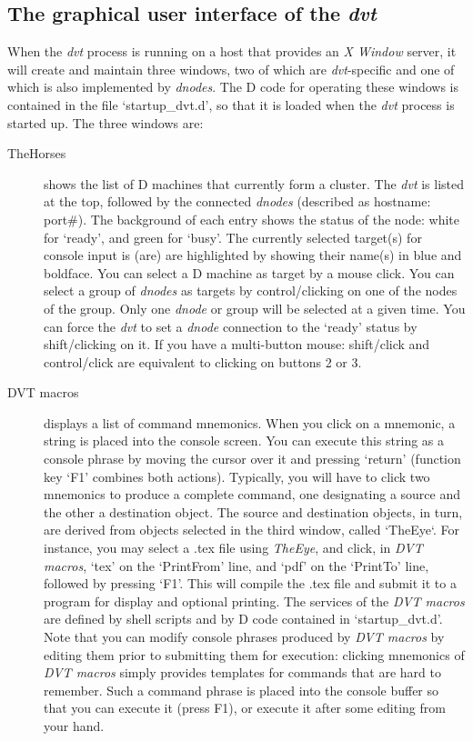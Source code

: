 \subsection{The graphical user interface of the  \emph{dvt}}

When the \emph{dvt} process is running on a host that provides an \emph{X Window} server, it will create and maintain three windows, two of which are \emph{dvt}-specific and one of which is also implemented by \emph{dnodes}. The D code for operating these windows is contained in the file `startup\_dvt.d', so that it is loaded when the \emph{dvt} process is started up. The three windows are:

\begin{description}
\item[TheHorses] shows the list of D machines that currently form a cluster. The \emph{dvt} is listed at the top, followed by the connected \emph{dnodes} (described as hostname: port\#). The background of each entry shows the status of the node: white for `ready', and green for `busy'. The currently selected target(s) for console input is (are) are highlighted by showing their name(s) in blue and boldface. You can select a D machine as target by a mouse click. You can select a group of \emph{dnodes} as targets by control/clicking on one of the nodes of the group. Only one \emph{dnode} or group will be selected at a given time. You can force the \emph{dvt} to set a \emph{dnode} connection to the `ready' status by shift/clicking on it. If you have a multi-button mouse: shift/click and control/click are equivalent to clicking on buttons 2 or 3.

\item[DVT macros] displays a list of command mnemonics. When you click on a mnemonic, a string is placed into the console screen. You can execute this string as a console phrase by moving the cursor over it and pressing `return' (function key `F1' combines both actions). Typically, you will have to click two mnemonics to produce a complete command, one designating a source and the other a destination object. The source and destination objects, in turn, are derived from objects selected in the third window, called `TheEye`. For instance, you may select a .tex file using \emph{TheEye}, and click, in \emph{DVT macros}, `tex' on the `PrintFrom' line, and `pdf' on the `PrintTo' line, followed by pressing `F1'. This will compile the .tex file and submit it to a program for display and optional printing. The services of the \emph{DVT macros} are defined by shell scripts and by D code contained in `startup\_dvt.d'. Note that you can modify console phrases produced by \emph{DVT macros} by editing them prior to submitting them for execution: clicking mnemonics of \emph{DVT macros} simply provides templates for commands that are hard to remember. Such a command phrase is placed into the console buffer so that you can execute it (press F1), or execute it after some editing from your hand.


\end{description}
